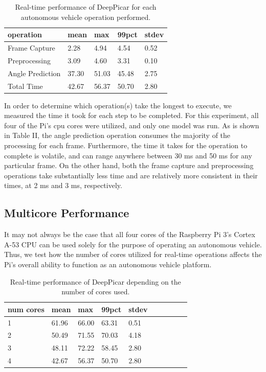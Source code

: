 \begin{table}[h]
  \centering
  \begin{tabular} {| l | l | l | l | l |}
    \hline
    \textbf{operation} & \textbf{mean} & \textbf{max} & \textbf{99pct} & \textbf{stdev} \\ \hline 
    Frame Capture & 2.28 & 4.94 & 4.54  & 0.52\\ \hline
    Preprocessing & 3.09 & 4.60 & 3.31 & 0.10 \\ \hline
    Angle Prediction & 37.30 & 51.03 & 45.48 & 2.75 \\  \hline
    Total Time & 42.67 & 56.37 & 50.70 & 2.80 \\
    \hline
  \end{tabular}
  \caption{Real-time performance of DeepPicar for each autonomous vehicle operation performed.}
\end{table}

In order to determine which operation(s) take the longest to execute, we measured the time it 
took for each step to be completed. For this experiment, all four of the Pi's cpu cores were utilized, 
and only one model was run. As is shown in Table II, the angle prediction operation consumes the 
majority of the processing for each frame. Furthermore, the time it takes for the operation to 
complete is volatile, and can range anywhere between 30 ms and 50 ms for any particular frame. On the 
other hand, both the frame capture and preprocessing operations take substantially less time 
and are relatively more consistent in their times, at 2 ms and 3 ms, respectively. 

\subsection{Multicore Performance}
It may not always be the case that all four cores of the Raspberry Pi 3's Cortex A-53 CPU can be used 
solely for the purpose of operating an autonomous vehicle. Thus, we test how the number of cores 
utilized for real-time operations affects the Pi's overall ability to function as an autonomous 
vehicle platform.

\begin{table}[h]
  \centering
  \begin{tabular} {| l | l | l | l | l | l | l | l | l | l |}
    \hline
    \textbf{num cores} & \textbf{mean} & \textbf{max} & \textbf{99pct} & \textbf{stdev} \\ \hline 
    1 & 61.96 & 66.00 & 63.31 & 0.51\\ \hline
    2 & 50.49 & 71.55 & 70.03 & 4.18 \\ \hline
    3 & 48.11 & 72.22 & 58.45 & 2.80 \\ \hline
    4 & 42.67 & 56.37 & 50.70 & 2.80 \\
    \hline
  \end{tabular}
  \caption{Real-time performance of DeepPicar depending on the number of cores used.}
\end{table}

